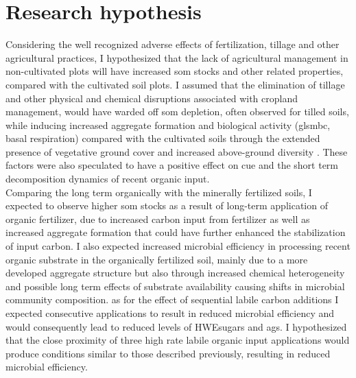 \section{Research hypothesis}
	Considering the well recognized adverse effects of fertilization, tillage and other agricultural practices, I hypothesized that the lack of agricultural management in non-cultivated plots will have increased \gls{som} stocks and other related properties, compared with the cultivated soil plots. I assumed that the elimination of tillage and other physical and chemical disruptions associated with cropland management, would have warded off \gls{som} depletion, often observed for tilled soils, while inducing increased aggregate formation and biological activity (gls{mbc}, basal respiration)  compared with the cultivated soils through the extended presence of vegetative ground cover and increased above-ground diversity . These factors were also speculated to have a positive effect on \gls{cue} and the short term decomposition dynamics of recent organic input.\\
	Comparing the long term organically with the minerally fertilized soils, I expected to observe higher \gls{som} stocks as a result of long-term application of organic fertilizer, due to increased carbon input from fertilizer as well as increased aggregate formation that could have further enhanced the stabilization of input carbon.  I also expected increased microbial efficiency in processing recent organic substrate in the organically fertilized soil, mainly due to a more developed aggregate structure but also through increased chemical heterogeneity and possible long term effects of substrate availability causing shifts in microbial community composition.
	as for the effect of sequential labile carbon additions I expected consecutive applications to result in reduced microbial efficiency and would consequently lead to reduced levels of HWEsugars and \gls{ags}.  I hypothesized that the close proximity of three high rate labile organic input applications would produce conditions similar to those described previously, resulting in reduced microbial efficiency.
